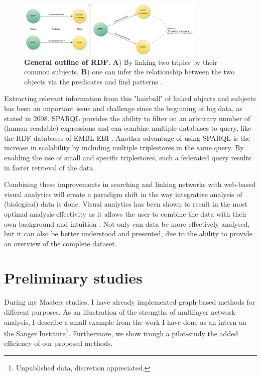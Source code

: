 \documentclass[twoside,fontsize=12pt]{article}
\begin{document}
\begin{figure}[H]
    \centering
    \includegraphics[width=0.8\textwidth]{rdf.pdf}
    \caption{\textbf{General outline of RDF.} \textbf{A}) By linking two triples by their common subjects, \textbf{B}) one can infer the relationship between the two objects via the predicates and find patterns%
    .}
    \label{fig:rdf}
\end{figure}
\noindent
Extracting relevant information from this "hairball" of linked objects and subjects has been an important issue and challenge since the beginning of big data, as \citet{Pavlopoulos2008} stated in 2008. SPARQL provides the ability to filter on an arbitrary number of (human-readable) expressions and can combine multiple databases to query, like the RDF-databases of EMBL-EBI \citep{Jupp2014}. Another advantage of using SPARQL is the increase in scalability by including multiple triplestores in the same query. By enabling the use of small and specific triplestores, such a federated query results in faster retrieval of the data.

Combining these improvements in searching and linking networks with web-based visual analytics will create a paradigm shift in the way integrative analysis of (biological) data is done. Visual analytics has been shown to result in the most optimal analysis-effectivity as it allows the user to combine the data with their own background and intuition %
. Not only can data be more effectively analysed, but it can also be better understood and presented, due to the ability to provide an overview of the complete dataset\cite{Thomas2005, Keim}. 
\newpage
\section*{Preliminary studies}
During my Masters studies, I have already implemented graph-based methods for different purposes. As an illustration of the strengths of multilayer network-analysis, I describe a small example from the work I have done as an intern an the Sanger Institute\footnote{Unpublished data, discretion appreciated.}. Furthermore, we show trough a pilot-study the added efficiency of our proposed methods.
\end{document}
